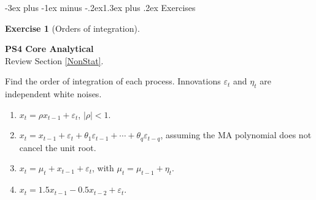 \documentclass[
  11pt,
]{book}
\makeatletter
\providecommand{\tightlist}{%
  \setlength{\itemsep}{0pt}\setlength{\parskip}{0pt}}
\renewcommand\section{\@startsection{section}{1}{\z@}
  {-3ex plus -1ex minus -.2ex}{1.3ex plus .2ex}
  {\normalfont\Large\bfseries\color{TextbookInk}}}
\theoremstyle{definition}
\theoremstyle{definition}
\theoremstyle{definition}
\newtheorem{exercise}{Exercise}[chapter]
\theoremstyle{definition}
\theoremstyle{remark}
\makeatother
\begin{document}
\section{Exercises}\label{nonstationarity-exercises}


\begin{exercisebox}

\begin{exercise}[Orders of integration]
\protect\hypertarget{exr:ex-order-integration}{}\label{exr:ex-order-integration}

\textbf{PS4 \textbar{} Core \textbar{} Analytical}\\
Review Section \ref{NonStat}.

Find the order of integration of each process. Innovations \(\varepsilon_t\) and \(\eta_t\) are independent white noises.

\begin{enumerate}
\def\labelenumi{\arabic{enumi}.}
\tightlist
\item
  \(x_t=\rho x_{t-1}+\varepsilon_t\), \(|\rho|<1\).
\item
  \(x_t=x_{t-1}+\varepsilon_t+\theta_1\varepsilon_{t-1}+\cdots+\theta_q\varepsilon_{t-q}\), assuming the MA polynomial does not cancel the unit root.
\item
  \(x_t=\mu_t+x_{t-1}+\varepsilon_t\), with \(\mu_t=\mu_{t-1}+\eta_t\).
\item
  \(x_t=1.5x_{t-1}-0.5x_{t-2}+\varepsilon_t\).
\end{enumerate}

\end{exercise}

\end{exercisebox}

\end{document}
